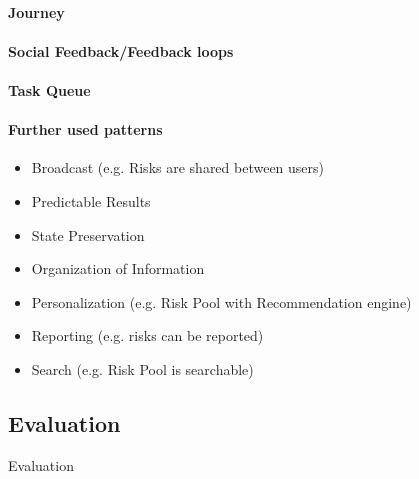 \paragraph*{Journey}

\paragraph*{Social Feedback/Feedback loops}

\paragraph*{Task Queue}

\paragraph*{Further used patterns}

\begin{itemize}
	\item Broadcast (e.g. Risks are shared between users)
	\item Predictable Results
	\item State Preservation
	\item Organization of Information
	\item Personalization (e.g. Risk Pool with Recommendation engine)
	\item Reporting (e.g. risks can be reported)
	\item Search (e.g. Risk Pool is searchable)
\end{itemize}


\subsection{Evaluation}
\label{sec:domainCd}
Evaluation
